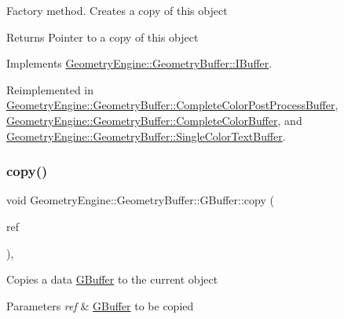 Factory method. Creates a copy of this object \begin{DoxyReturn}{Returns}
Pointer to a copy of this object 
\end{DoxyReturn}


Implements \mbox{\hyperlink{class_geometry_engine_1_1_geometry_buffer_1_1_i_buffer_a41cb28df27adaea0555afd41169aebd6}{Geometry\+Engine\+::\+Geometry\+Buffer\+::\+I\+Buffer}}.



Reimplemented in \mbox{\hyperlink{class_geometry_engine_1_1_geometry_buffer_1_1_complete_color_post_process_buffer_a8a484d5196bba7b92f31e500229743bc}{Geometry\+Engine\+::\+Geometry\+Buffer\+::\+Complete\+Color\+Post\+Process\+Buffer}}, \mbox{\hyperlink{class_geometry_engine_1_1_geometry_buffer_1_1_complete_color_buffer_a56aee74c7523f0b16fd8b97c8c44f84f}{Geometry\+Engine\+::\+Geometry\+Buffer\+::\+Complete\+Color\+Buffer}}, and \mbox{\hyperlink{class_geometry_engine_1_1_geometry_buffer_1_1_single_color_text_buffer_add00c2857f9d425600ef83d50a9c8019}{Geometry\+Engine\+::\+Geometry\+Buffer\+::\+Single\+Color\+Text\+Buffer}}.

\mbox{\label{class_geometry_engine_1_1_geometry_buffer_1_1_g_buffer_a9f20eb78703ef048d59a54f90ee09f25}} 
\subsubsection{\texorpdfstring{copy()}{copy()}}
{\footnotesize\ttfamily void Geometry\+Engine\+::\+Geometry\+Buffer\+::\+G\+Buffer\+::copy (\begin{DoxyParamCaption}\item[{const \mbox{\hyperlink{class_geometry_engine_1_1_geometry_buffer_1_1_g_buffer}{G\+Buffer}} \&}]{ref }\end{DoxyParamCaption})\hspace{0.3cm}{\ttfamily [protected]}, {\ttfamily [virtual]}}

Copies a data \mbox{\hyperlink{class_geometry_engine_1_1_geometry_buffer_1_1_g_buffer}{G\+Buffer}} to the current object 
\begin{DoxyParams}{Parameters}
{\em ref} & \mbox{\hyperlink{class_geometry_engine_1_1_geometry_buffer_1_1_g_buffer}{G\+Buffer}} to be copied \\
\hline
\end{DoxyParams}


